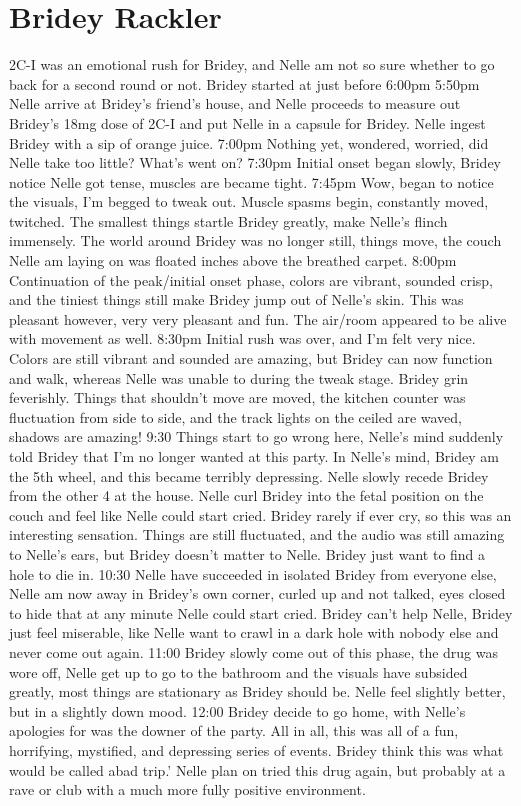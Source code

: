 \documentclass[12pt]{book}
\begin{document}
\chapter{Bridey Rackler}

2C-I was an emotional rush for Bridey, and Nelle am not so sure whether to go back for a second round or not. Bridey started at just before 6:00pm 5:50pm Nelle arrive at Bridey's friend's house, and Nelle proceeds to measure out Bridey's 18mg dose of 2C-I and put Nelle in a capsule for Bridey. Nelle ingest Bridey with a sip of orange juice. 7:00pm Nothing yet, wondered, worried, did Nelle take too little? What's went on? 7:30pm Initial onset began slowly, Bridey notice Nelle got tense, muscles are became tight. 7:45pm Wow, began to notice the visuals, I'm begged to tweak out. Muscle spasms begin, constantly moved, twitched. The smallest things startle Bridey greatly, make Nelle's flinch immensely. The world around Bridey was no longer still, things move, the couch Nelle am laying on was floated inches above the breathed carpet. 8:00pm Continuation of the peak/initial onset phase, colors are vibrant, sounded crisp, and the tiniest things still make Bridey jump out of Nelle's skin. This was pleasant however, very very pleasant and fun. The air/room appeared to be alive with movement as well. 8:30pm Initial rush was over, and I'm felt very nice. Colors are still vibrant and sounded are amazing, but Bridey can now function and walk, whereas Nelle was unable to during the tweak stage. Bridey grin feverishly. Things that shouldn't move are moved, the kitchen counter was fluctuation from side to side, and the track lights on the ceiled are waved, shadows are amazing! 9:30 Things start to go wrong here, Nelle's mind suddenly told Bridey that I'm no longer wanted at this party. In Nelle's mind, Bridey am the 5th wheel, and this became terribly depressing. Nelle slowly recede Bridey from the other 4 at the house. Nelle curl Bridey into the fetal position on the couch and feel like Nelle could start cried. Bridey rarely if ever cry, so this was an interesting sensation. Things are still fluctuated, and the audio was still amazing to Nelle's ears, but Bridey doesn't matter to Nelle. Bridey just want to find a hole to die in. 10:30 Nelle have succeeded in isolated Bridey from everyone else, Nelle am now away in Bridey's own corner, curled up and not talked, eyes closed to hide that at any minute Nelle could start cried. Bridey can't help Nelle, Bridey just feel miserable, like Nelle want to crawl in a dark hole with nobody else and never come out again. 11:00 Bridey slowly come out of this phase, the drug was wore off, Nelle get up to go to the bathroom and the visuals have subsided greatly, most things are stationary as Bridey should be. Nelle feel slightly better, but in a slightly down mood. 12:00 Bridey decide to go home, with Nelle's apologies for was the downer of the party. All in all, this was all of a fun, horrifying, mystified, and depressing series of events. Bridey think this was what would be called abad trip.' Nelle plan on tried this drug again, but probably at a rave or club with a much more fully positive environment.
\end{document}
